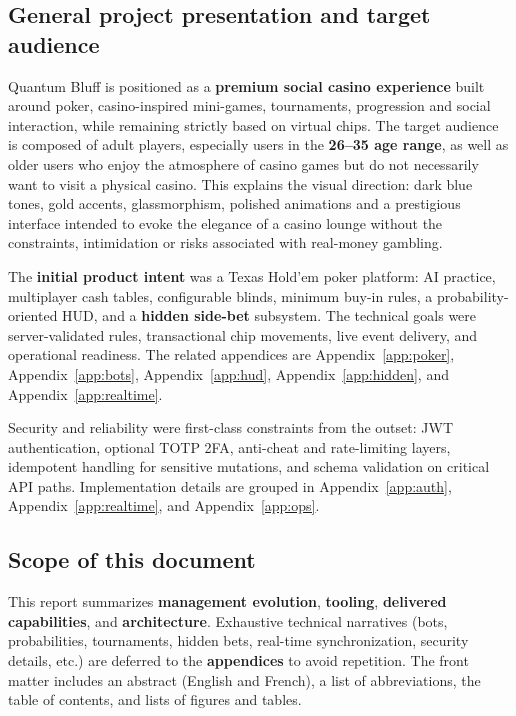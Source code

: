 \documentclass[11pt,a4paper]{article}
\begin{document}
\subsection{General project presentation and target audience}

Quantum Bluff is positioned as a \textbf{premium social casino experience} built around poker, casino-inspired mini-games, tournaments, progression and social interaction, while remaining strictly based on virtual chips. The target audience is composed of adult players, especially users in the \textbf{26--35 age range}, as well as older users who enjoy the atmosphere of casino games but do not necessarily want to visit a physical casino. This explains the visual direction: dark blue tones, gold accents, glassmorphism, polished animations and a prestigious interface intended to evoke the elegance of a casino lounge without the constraints, intimidation or risks associated with real-money gambling.

The \textbf{initial product intent} was a Texas Hold'em poker platform: AI practice, multiplayer cash tables, configurable blinds, minimum buy-in rules, a probability-oriented HUD, and a \textbf{hidden side-bet} subsystem. The technical goals were server-validated rules, transactional chip movements, live event delivery, and operational readiness. The related appendices are Appendix~\ref{app:poker}, Appendix~\ref{app:bots}, Appendix~\ref{app:hud}, Appendix~\ref{app:hidden}, and Appendix~\ref{app:realtime}.

Security and reliability were first-class constraints from the outset: JWT authentication, optional TOTP 2FA, anti-cheat and rate-limiting layers, idempotent handling for sensitive mutations, and schema validation on critical API paths. Implementation details are grouped in Appendix~\ref{app:auth}, Appendix~\ref{app:realtime}, and Appendix~\ref{app:ops}.

\subsection{Scope of this document}

This report summarizes \textbf{management evolution}, \textbf{tooling}, \textbf{delivered capabilities}, and \textbf{architecture}. Exhaustive technical narratives (bots, probabilities, tournaments, hidden bets, real-time synchronization, security details, etc.) are deferred to the \textbf{appendices} to avoid repetition. The front matter includes an abstract (English and French), a list of abbreviations, the table of contents, and lists of figures and tables.
\end{document}
